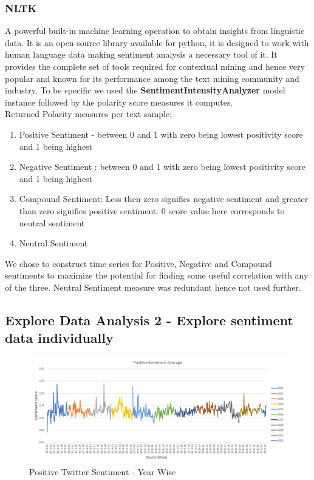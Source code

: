 \documentclass[sigconf, nonacm]{acmart}
\begin{document}
\subsubsection{NLTK}
A powerful built-in machine learning operation to obtain insights from linguistic data. It is an open-source library available for python, it is designed to work with human language data making sentiment analysis a necessary tool of it. It provides the complete set of tools required for contextual mining and hence very popular and known for its performance among the text mining community and industry. To be specific we used the \textbf{SentimentIntensityAnalyzer} model instance followed by the polarity score measures it computes.
\\Returned Polarity measures per text sample:
\begin{enumerate}
    \item Positive Sentiment - between 0 and 1 with zero being lowest positivity score and 1 being highest
    \item Negative Sentiment : between 0 and 1 with zero being lowest positivity score and 1 being highest
    \item Compound Sentiment: Less then zero signifies negative sentiment and greater than zero signifies positive sentiment. 0 score value here corresponds to neutral sentiment
    \item Neutral Sentiment
\end{enumerate}
We chose to construct time series for Positive, Negative and Compound sentiments to maximize the potential for finding some useful correlation with any of the three. Neutral Sentiment measure was redundant hence not used further.

\subsection{Explore Data Analysis 2 - Explore sentiment data individually} %
\begin{figure}[H]
  \centering
  \includegraphics[width=\linewidth]{positive_sent_raw.png}
  \caption{Positive Twitter Sentiment - Year Wise}
\end{figure}
\end{document}
